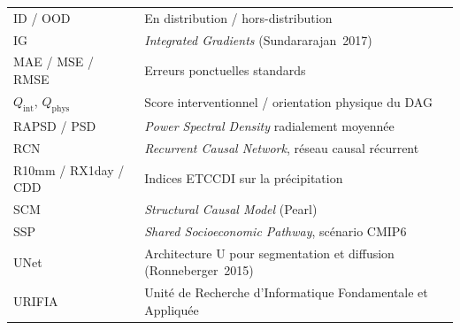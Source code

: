 \documentclass[14pt,a4paper,openany]{extreport}
\begin{document}
\begin{longtable}{p{3cm} p{11.5cm}}
ID / OOD & En distribution / hors-distribution \\
IG & \emph{Integrated Gradients} (Sundararajan~2017) \\
MAE / MSE / RMSE & Erreurs ponctuelles standards \\
$Q_{\mathrm{int}}$, $Q_{\mathrm{phys}}$ & Score interventionnel / orientation physique du DAG \\
RAPSD / PSD & \emph{Power Spectral Density} radialement moyennée \\
RCN & \emph{Recurrent Causal Network}, réseau causal récurrent \\
R10mm / RX1day / CDD & Indices ETCCDI sur la précipitation \\
SCM & \emph{Structural Causal Model} (Pearl) \\
SSP & \emph{Shared Socioeconomic Pathway}, scénario CMIP6 \\
UNet & Architecture U pour segmentation et diffusion (Ronneberger~2015) \\
URIFIA & Unité de Recherche d'Informatique Fondamentale et Appliquée \\
\bottomrule
\end{longtable}
\end{document}

